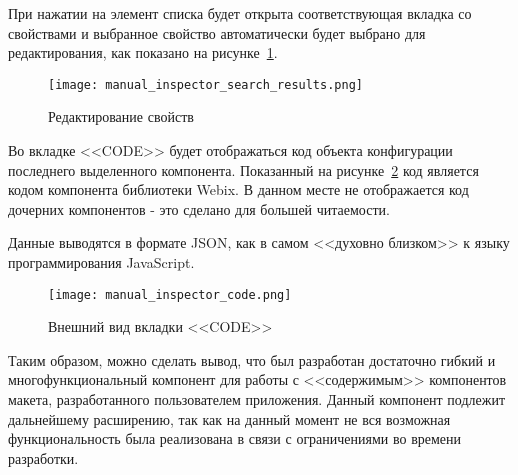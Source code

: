 При нажатии на элемент списка будет открыта соответствующая вкладка со свойствами и выбранное свойство автоматически будет выбрано для редактирования, как показано на рисунке~\ref{sec:manual:inspector_search_manual_results}.\pagebreak

\begin{figure}[ht]
  \centering
    \texttt{[image: manual\_inspector\_search\_results.png]}
    \caption{Редактирование свойств}
    \label{sec:manual:inspector_search_manual_results}
\end{figure}

Во вкладке <<CODE>> будет отображаться код объекта конфигурации последнего выделенного компонента. Показанный на рисунке~\ref{sec:manual:inspector_code} код является кодом компонента библиотеки Webix. В данном месте не отображается код дочерних компонентов - это сделано для большей читаемости.

Данные выводятся в формате JSON, как в самом <<духовно близком>> к языку программирования JavaScript.

\begin{figure}[ht]
  \centering
    \texttt{[image: manual\_inspector\_code.png]}
    \caption{Внешний вид вкладки <<CODE>>}
    \label{sec:manual:inspector_code}
\end{figure}

Таким образом, можно сделать вывод, что был разработан достаточно гибкий и многофункциональный компонент для работы с <<содержимым>> компонентов макета, разработанного пользователем приложения. Данный компонент подлежит дальнейшему расширению, так как на данный момент не вся возможная функциональность была реализована в связи с ограничениями во времени разработки.

